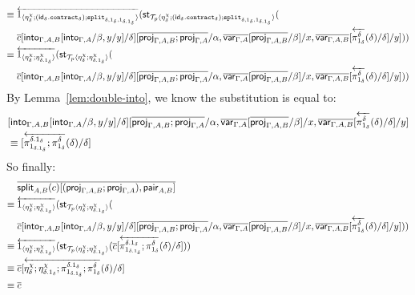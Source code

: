 \documentclass[10pt]{article}
\theoremstyle{definition}
\newcommand{\id}{\mathsf{id}}
\newcommand{\rewrite}[2]{\overleftarrow{#1}(#2)}
\newcommand\StI[2]{\ensuremath{\mathsf{st}_{#1}(#2)}}
\newcommand\ApEl[2]{\mathcal{T}_{#1}\langle#2\rangle}
\newcommand\bdot[0]{\mathbin{.}}
\begin{document}
\begin{enumerate}[style = multiline, labelwidth = 80pt]
\begin{align*}
\equiv{} &\rewrite{\ApOne{\eta^\chi_\delta;(\id_\delta \bdot \contract{\delta});\tsplit{\delta,1_\delta,1_{\delta.1_\delta}}}}{\StI{\ApEl{p}{\eta^\chi_\delta;(\id_\delta \bdot \contract{\delta});\tsplit{\delta,1_\delta,1_{\delta.1_\delta}}}}{\\&\upstairs{c}[\into{\Gamma, A, B}[\into{\Gamma, A}/\beta, y/y] /\delta][\upstairs{\proj{\Gamma, A, B};\proj{\Gamma, A}}/\alpha, \upstairs{\qvar{\Gamma, A}}[\upstairs{\proj{\Gamma, A, B}}/\beta]/x, \upstairs{\qvar{\Gamma, A, B}}[\rewrite{\pi^\delta_{1_\delta}}{\delta}/\delta]/y]}} \\
\equiv{} &\rewrite{\ApOne{\eta^\chi_\delta;\eta^\chi_{\delta.1_\delta}}}{\StI{\ApEl{p}{\eta^\chi_\delta;\eta^\chi_{\delta.1_\delta}}}{\\&\upstairs{c}[\into{\Gamma, A, B}[\into{\Gamma, A}/\beta, y/y] /\delta][\upstairs{\proj{\Gamma, A, B};\proj{\Gamma, A}}/\alpha, \upstairs{\qvar{\Gamma, A}}[\upstairs{\proj{\Gamma, A, B}}/\beta]/x, \upstairs{\qvar{\Gamma, A, B}}[\rewrite{\pi^\delta_{1_\delta}}{\delta}/\delta]/y]}}
\end{align*}
By Lemma~\ref{lem:double-into}, we know the substitution is equal to:
\begin{align*}
&[\into{\Gamma, A, B}[\into{\Gamma, A}/\beta, y/y] /\delta][\upstairs{\proj{\Gamma, A, B};\proj{\Gamma, A}}/\alpha, \upstairs{\qvar{\Gamma, A}}[\upstairs{\proj{\Gamma, A, B}}/\beta]/x, \upstairs{\qvar{\Gamma, A, B}}[\rewrite{\pi^\delta_{1_\delta}}{\delta}/\delta]/y] \\
&\equiv [\rewrite{\pi^{\delta.1_\delta}_{1_{\delta.1_\delta}};\pi^{\delta}_{1_{\delta}}}{\delta}/\delta]
\end{align*}
So finally:
\begin{align*}
&\upstairs{\qsplit{A,B}(c)[(\proj{\Gamma, A, B};\proj{\Gamma, A}), \allowbreak\qpair{A,B}]} \\
\equiv{} &\rewrite{\ApOne{\eta^\chi_\delta;\eta^\chi_{\delta.1_\delta}}}{\StI{\ApEl{p}{\eta^\chi_\delta;\eta^\chi_{\delta.1_\delta}}}{\\&\upstairs{c}[\into{\Gamma, A, B}[\into{\Gamma, A}/\beta, y/y] /\delta][\upstairs{\proj{\Gamma, A, B};\proj{\Gamma, A}}/\alpha, \upstairs{\qvar{\Gamma, A}}[\upstairs{\proj{\Gamma, A, B}}/\beta]/x, \upstairs{\qvar{\Gamma, A, B}}[\rewrite{\pi^\delta_{1_\delta}}{\delta}/\delta]/y]}} \\
\equiv{} &\rewrite{\ApOne{\eta^\chi_\delta;\eta^\chi_{\delta.1_\delta}}}{\StI{\ApEl{p}{\eta^\chi_\delta;\eta^\chi_{\delta.1_\delta}}}{\upstairs{c}[\rewrite{\pi^{\delta.1_\delta}_{1_{\delta.1_\delta}};\pi^{\delta}_{1_{\delta}}}{\delta}/\delta]}} \\
\equiv{} &\upstairs{c}[\rewrite{\eta^\chi_\delta;\eta^\chi_{\delta.1_\delta};\pi^{\delta.1_\delta}_{1_{\delta.1_\delta}};\pi^{\delta}_{1_{\delta}}}{\delta}/\delta]\\
\equiv{} &\upstairs{c}
\end{align*}


\end{enumerate}
\end{document}
